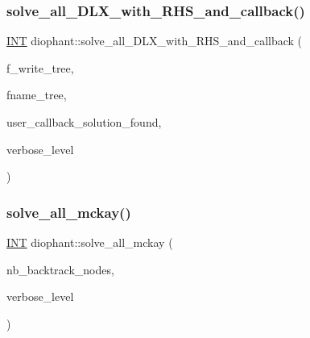 \subsubsection{\texorpdfstring{solve\+\_\+all\+\_\+\+D\+L\+X\+\_\+with\+\_\+\+R\+H\+S\+\_\+and\+\_\+callback()}{solve\_all\_DLX\_with\_RHS\_and\_callback()}}
{\footnotesize\ttfamily \mbox{\hyperlink{galois_8h_a09fddde158a3a20bd2dcadb609de11dc}{I\+NT}} diophant\+::solve\+\_\+all\+\_\+\+D\+L\+X\+\_\+with\+\_\+\+R\+H\+S\+\_\+and\+\_\+callback (\begin{DoxyParamCaption}\item[{\mbox{\hyperlink{galois_8h_a09fddde158a3a20bd2dcadb609de11dc}{I\+NT}}}]{f\+\_\+write\+\_\+tree,  }\item[{const \mbox{\hyperlink{galois_8h_ab6cc7b4aeb6ea31aba2b3fbfc83ff5e6}{B\+Y\+TE}} $\ast$}]{fname\+\_\+tree,  }\item[{void($\ast$)(\mbox{\hyperlink{galois_8h_a09fddde158a3a20bd2dcadb609de11dc}{I\+NT}} $\ast$sol, \mbox{\hyperlink{galois_8h_a09fddde158a3a20bd2dcadb609de11dc}{I\+NT}} len, \mbox{\hyperlink{galois_8h_a09fddde158a3a20bd2dcadb609de11dc}{I\+NT}} \mbox{\hyperlink{plane__search_8_c_a0029b734487624c93c3a72d74a8f2bf9}{nb\+\_\+sol}}, void $\ast$data)}]{user\+\_\+callback\+\_\+solution\+\_\+found,  }\item[{\mbox{\hyperlink{galois_8h_a09fddde158a3a20bd2dcadb609de11dc}{I\+NT}}}]{verbose\+\_\+level }\end{DoxyParamCaption})}

\mbox{\label{classdiophant_a37f518a1d004c65dc9adc0878dc6590b}} 
\subsubsection{\texorpdfstring{solve\+\_\+all\+\_\+mckay()}{solve\_all\_mckay()}}
{\footnotesize\ttfamily \mbox{\hyperlink{galois_8h_a09fddde158a3a20bd2dcadb609de11dc}{I\+NT}} diophant\+::solve\+\_\+all\+\_\+mckay (\begin{DoxyParamCaption}\item[{\mbox{\hyperlink{galois_8h_a09fddde158a3a20bd2dcadb609de11dc}{I\+NT}} \&}]{nb\+\_\+backtrack\+\_\+nodes,  }\item[{\mbox{\hyperlink{galois_8h_a09fddde158a3a20bd2dcadb609de11dc}{I\+NT}}}]{verbose\+\_\+level }\end{DoxyParamCaption})}

